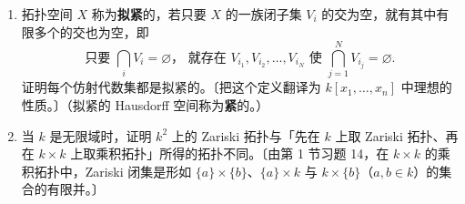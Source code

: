\begin{enumerate}
（b）若 \(D = r^2\)，证明 \(I\) 的准素分解是 \(I = Q_+ \cap Q_-\)，其中
\[
Q_{\pm} = \left(I,\ (x-y)(x-z)(y-z) \pm r\right).
\]
证明 \(Q_+\) 与 \(Q_-\) 是极大理想，且 \(\mathbb{Q}[x,y,z]\) 模 \(Q_+\) 或 \(Q_-\) 是 \(f(x)\) 在 \(\mathbb{Q}\) 上的分裂域。

\item 拓扑空间 \(X\) 称为\textbf{拟紧}的，若只要 \(X\) 的一族闭子集 \(V_i\) 的交为空，就有其中有限多个的交也为空，即
\[
\text{只要 } \bigcap_iV_i = \varnothing，\text{ 就存在 } V_{i_1}, V_{i_2}, \ldots, V_{i_N} \text{ 使 } \bigcap_{j=1}^{N}V_{i_j} = \varnothing.
\]
证明每个仿射代数集都是拟紧的。〔把这个定义翻译为 \(k[x_1, \ldots, x_n]\) 中理想的性质。〕（拟紧的 Hausdorff 空间称为\textbf{紧}的。）

\item 当 \(k\) 是无限域时，证明 \(k^2\) 上的 Zariski 拓扑与「先在 \(k\) 上取 Zariski 拓扑、再在 \(k \times k\) 上取乘积拓扑」所得的拓扑不同。〔由第 1 节习题 14，在 \(k \times k\) 的乘积拓扑中，Zariski 闭集是形如 \(\{a\} \times \{b\}\)、\(\{a\} \times k\) 与 \(k \times \{b\}\)（\(a, b \in k\)）的集合的有限并。〕
\end{enumerate}

